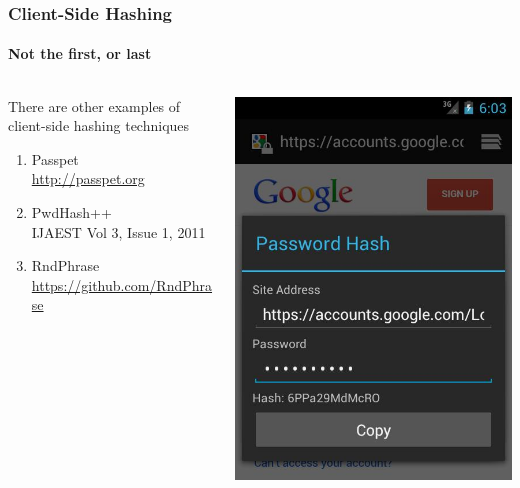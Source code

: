 \documentclass[handout, notes=hide]{beamer}
\begin{document}

\begin{frame}
\frametitle{Client-Side Hashing}
\framesubtitle{Not the first, or last}
\setlength{\parskip}{0.5em}

\begin{columns}[T]
\begin{column}[T]{0.6\textwidth}
\setlength{\parskip}{0.5em}
There are other examples of client-side hashing techniques
\begin{enumerate}
\item Passpet \\ \url{http://passpet.org}
\item PwdHash++ \\ IJAEST Vol 3, Issue 1, 2011
\item RndPhrase \\ \url{https://github.com/RndPhrase}
\end{enumerate}
\end{column}
\begin{column}[T]{0.4\textwidth}
\vspace{0.0em}
\includegraphics[width=1.0\textwidth]{android}
\end{column}
\end{columns}


\end{frame}
\end{document}
